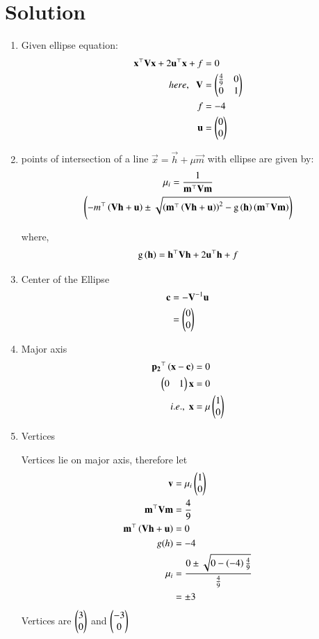 \documentclass[journal,12pt,twocolumn]{IEEEtran}
\begin{document}
\section{Solution}
\begin{enumerate}

	\item Given ellipse equation:
\begin{align}
	\mathbf{x}^{\top} \mathbf{V} \mathbf{x} + 2 \mathbf{u}^{\top}\mathbf{x} +f &= 0\\
	here,\;\;
	\mathbf{V} &= \begin{pmatrix}\frac{4}{9} & 0\\0&1\end{pmatrix}\\
	f &= -4\\
	\mathbf{u} &= \begin{pmatrix}0\\0\end{pmatrix}
\end{align}

\item points of intersection of a line $\vec{x} = \vec{h}+ \mu\vec{m}$ with ellipse are given by:
\begin{multline}
	\mu_i = \frac{1}{\mathbf{m}^{\top}\mathbf{V}\mathbf{m}} \\ \left(   -m^{\top}\left(\mathbf{V}\mathbf{h}+\mathbf{u}\right)  \pm \sqrt{\left(\mathbf{m}^{\top}\left(\mathbf{V}\mathbf{h}+\mathbf{u}\right)\right)^2 - \text{g}\left(\mathbf{h}\right)\left(\mathbf{m}^{\top}\mathbf{V}\mathbf{m}\right)} \right) 
\end{multline}

where,
\begin{align}
	\text{g}\left(\mathbf{h}\right) = \mathbf{h}^{\top}\mathbf{V}\mathbf{h} + 2\mathbf{u}^{\top}\mathbf{h} +f
\end{align}
\item Center of the Ellipse
	\begin{align}
	\mathbf{c} &= -\mathbf{V}^{-1}\mathbf{u}\\
		&= \begin{pmatrix}0\\0\end{pmatrix}
	\end{align}

\item Major axis
	\begin{align}
		\mathbf{p_2}^{\top}\left(\mathbf{x} - \mathbf{c}\right) &=0\\
		\begin{pmatrix}0&1\end{pmatrix}\mathbf{x} &= 0\\
		i.e., \; \mathbf{x} &= \mu \begin{pmatrix}1\\0\end{pmatrix}
	\end{align}
\item Vertices

Vertices lie on major axis, therefore let
\begin{align}
	\mathbf{v} &= {\mu}_i \begin{pmatrix}1\\0\end{pmatrix}\\
	\mathbf{m}^{\top}\mathbf{V}\mathbf{m} &= \frac{4}{9}\\
	\mathbf{m}^{\top}\left(\mathbf{V}\mathbf{h}+\mathbf{u}\right) &= 0\\
	g(h) &= -4\\
	{\mu}_i &= \frac{0 \pm \sqrt{0 - \left(-4\right)\frac{4}{9}}}{\frac{4}{9}}\\
		&= \pm 3
\end{align}
Vertices are $\begin{pmatrix}3\\0\end{pmatrix}$ and $\begin{pmatrix}-3\\0\end{pmatrix}$ 


\end{enumerate}
\end{document}
